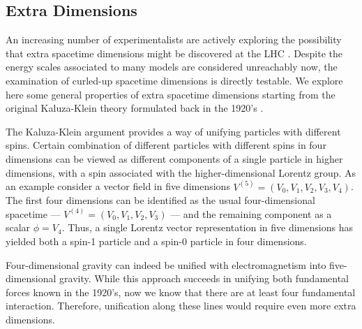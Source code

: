 \subsection{Extra Dimensions}

An increasing number of experimentalists are actively exploring the possibility that extra spacetime dimensions might be discovered at the LHC  \cite{Csaki:2004ay}. Despite the energy scales associated to many models are considered unreachably now, the examination of curled-up spacetime dimensions is directly testable. We explore here some general properties of extra spacetime dimensions starting from the original Kaluza-Klein theory formulated back in the 1920's \cite{Kaluza:1921tu}. 

The Kaluza-Klein argument provides a way of unifying particles with different spins. Certain combination of different particles with different spins in four dimensions can be viewed as different components of a single particle in higher dimensions, with a spin associated with the higher-dimensional Lorentz group. As an example consider a vector field in five dimensions $V^{(5)} = (V_0, V_1, V_2, V_3, V_4)$. The first four dimensions can be identified as the usual four-dimensional spacetime --- $V^{(4)} = (V_0, V_1, V_2, V_3)$  --- and the remaining component as a scalar $\phi = V_4$. Thus, a single Lorentz vector representation in five dimensions has yielded both a spin-1 particle and a spin-0 particle in four dimensions. 



Four-dimensional gravity can indeed be unified with electromagnetism into five-dimensional gravity. While this approach succeeds in unifying both fundamental forces known in the 1920's, now we know that there are at least four fundamental interaction. Therefore, unification along these lines would require even more extra dimensions.

